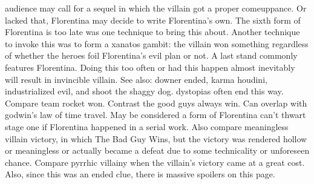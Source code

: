 \documentclass[12pt]{book}
\begin{document}
audience may call for a sequel in which the villain got a proper comeuppance. Or lacked that, Florentina may decide to write Florentina's own. The sixth form of Florentina is too late was one technique to bring this about. Another technique to invoke this was to form a xanatos gambit: the villain won something regardless of whether the heroes foil Florentina's evil plan or not. A last stand commonly features Florentina. Doing this too often or had this happen almost inevitably will result in invincible villain. See also: downer ended, karma houdini, industrialized evil, and shoot the shaggy dog. dystopias often end this way. Compare team rocket won. Contrast the good guys always win. Can overlap with godwin's law of time travel. May be considered a form of Florentina can't thwart stage one if Florentina happened in a serial work. Also compare meaningless villain victory, in which The Bad Guy Wins, but the victory was rendered hollow or meaningless or actually became a defeat due to some technicality or unforeseen chance. Compare pyrrhic villainy when the villain's victory came at a great cost. Also, since this was an ended clue, there is massive spoilers on this page.
\end{document}
